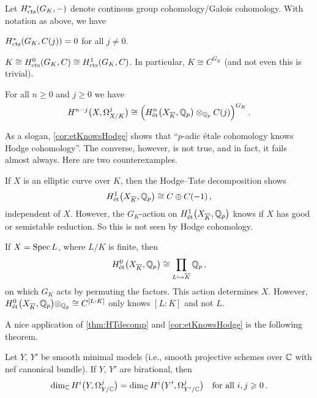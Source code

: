 \documentclass[a4paper, 10pt, oneside, DIV=9, chapterprefix=true, numbers=enddot,bibliography=totoc]{scrbook}
\begin{document}
\begin{thm}[Tate]
	Let $H_{\mathrm{cts}}^*(G_K,-)$ denote continous group cohomology/Galois cohomology. With notation as above, we have
	\begin{numerate}
		\item $H_{\mathrm{cts}}^*(G_K,C(j))=0$ for all $j\neq 0$.
		\item $K\cong H_{\mathrm{cts}}^0(G_K,C)\cong H_{\mathrm{cts}}^1(G_K,C)$. In particular, $K\cong C^{G_K}$ (and not even this is trivial).
	\end{numerate}
\end{thm}
\begin{cor}\label{cor:etKnowsHodge}
	For all $n\geq 0$ and $j\geq 0$ we have
	\begin{equation*}
		H^{n-j}\big(X,\Omega_{X/K}^j\big)\cong \Big(H_\et^n\big(X_{\ov{K}},\IQ_p\big)\otimes_{\IQ_p}C(j)\Big)^{\smash{G_K}}\,.
	\end{equation*}
\end{cor}
\begin{cntx}
	As a slogan, \cref{cor:etKnowsHodge} shows that \enquote{$p$-adic étale cohomology knows Hodge cohomology}. The converse, however, is not true, and in fact, it fails almost always. Here are two counterexamples.
	\begin{numerate}
		\item If $X$ is an elliptic curve over $K$, then the Hodge--Tate decomposition shows
		\begin{equation*}
			H_\et^1\big(X_{\ov{K}},\IQ_p\big)\cong C\oplus C(-1)\,,
		\end{equation*}
		independent of $X$. However, the $G_K$-action on $H_\et^1\big(X_{\ov{K}},\IQ_p\big)$ knows if $X$ has good or semistable reduction. So this is not seen by Hodge cohomology.
		\item If $X=\operatorname{Spec} L$, where $L/K$ is finite, then
		\begin{equation*}
			H_\et^0\big(X_{\ov{K}},\IQ_p\big)\cong \prod_{L\monomorphism\ov{K}}\IQ_p\,,
		\end{equation*}
		on which $G_K$ acts by permuting the factors. This action determines $X$. However, $H_\et^0\big(X_{\ov{K}},\IQ_p\big)\otimes_{\IQ_p}\cong C^{[L:K]}$ only knows $[L:K]$ and not $L$.
	\end{numerate}
\end{cntx}
A nice application of \cref{thm:HTdecomp} and \cref{cor:etKnowsHodge} is the following theorem.
\begin{thm}\label{thm:MinimalModels}
	Let $Y$, $Y'$ be smooth minimal models (i.e., smooth projective schemes over $\mathbb{C}$ with nef canonical bundle). If $Y$, $Y'$ are birational, then
	\begin{equation*}
		\dim_{\mathbb{C}} H^i\big(Y,\Omega_{Y/\mathbb{C}}^j\big)=\dim_{\mathbb{C}} H^i\big(Y',\Omega_{Y'/\mathbb{C}}^j\big)\quad\text{for all }i,j\geqslant 0\,.
	\end{equation*}
\end{thm}
\end{document}
